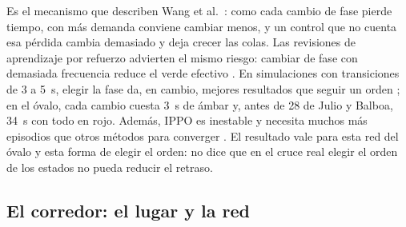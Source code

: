Es el mecanismo que describen Wang et al.\ \citep{Wang2022_SwitchingLoss}:
como cada cambio de fase pierde tiempo, con más demanda conviene cambiar
menos, y un control que no cuenta esa pérdida cambia demasiado y deja
crecer las colas. Las revisiones de aprendizaje por refuerzo advierten
el mismo riesgo: cambiar de fase con demasiada frecuencia reduce el verde
efectivo \citep{Wei2019_Survey}. En simulaciones con transiciones de 3 a
5~s, elegir la fase da, en cambio, mejores resultados que seguir un
orden \citep{Ibrokhimov2022_BiasedPressure}; en el óvalo, cada cambio
cuesta 3~s de ámbar y, antes de 28 de Julio y Balboa, 34~s con todo en
rojo. Además, IPPO es inestable y necesita muchos más episodios que
otros métodos para converger \citep{Ault2021_RESCO}. El resultado vale
para esta red del óvalo y esta forma de elegir el orden: no dice que en
el cruce real elegir el orden de los estados no pueda reducir el
retraso.

\clearpage

\subsection*{El corredor: el lugar y la red}

